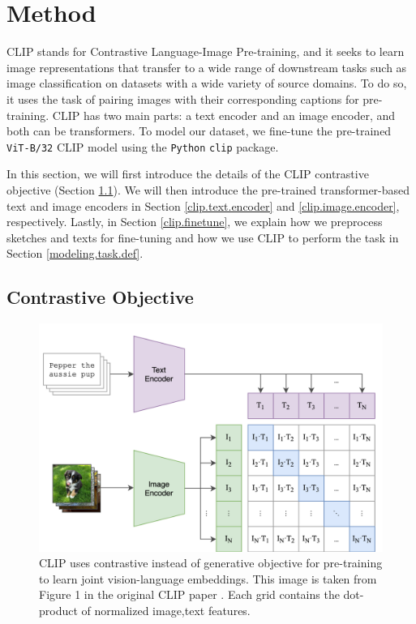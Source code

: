 \section{Method} \label{modeling.method}
CLIP stands for Contrastive Language-Image Pre-training, and it seeks to learn image representations that transfer to a wide range of downstream tasks such as image classification on datasets with a wide variety of source domains. To do so, it uses the task of pairing images with their corresponding captions for pre-training.   
CLIP has two main parts: a text encoder and an image encoder, and both can be transformers. 
To model our dataset, we fine-tune the pre-trained \texttt{ViT-B/32} CLIP model using the \texttt{Python} \texttt{clip} package. 

In this section, we will first introduce the details of the CLIP contrastive objective (Section \ref{clip.objective}). We will then introduce the pre-trained transformer-based text and image encoders in Section \ref{clip.text.encoder} and \ref{clip.image.encoder}, respectively. Lastly, in Section \ref{clip.finetune}, we explain how we preprocess sketches and texts for fine-tuning and how we use CLIP to perform the task in Section \ref{modeling.task.def}.

\subsection{Contrastive Objective} \label{clip.objective}

\begin{figure}[!htb]
\centering
\includegraphics[width=0.7\linewidth]{modeling/CLIP.png}  
\caption{CLIP uses contrastive instead of generative objective for pre-training to learn joint vision-language embeddings. This image is taken from Figure 1 in the original CLIP paper \citep{CLIPpaper}. Each grid contains the dot-product of normalized image,text features.}
\label{modeling.clip.pretrainingobj}
\end{figure}

